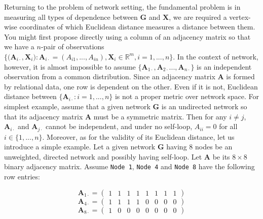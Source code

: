 \documentclass[12pt]{article}
\theoremstyle{definition}
\begin{document}
Returning to the problem of network setting, the fundamental problem is in measuring all types of dependence between $\boldsymbol{G}$ and $\boldsymbol{X}$, we are required a vertex-wise coordinates of which Euclidean distance measures a distance between them. You might first propose directly using a column of an adjacency matrix so that we have a $n$-pair of observations $\big\{ \big( \boldsymbol{A}_{i \cdot} , \boldsymbol{X}_{i} \big) : \boldsymbol{A}_{i \cdot} = (A_{i 1} , ... , A_{i n} ), \boldsymbol{X}_{i} \in \mathbb{R}^{m}, i=1,...,n  \big\}.$ In the context of network, however, it is almost impossible to assume $\{ \boldsymbol{A}_{1 \cdot}, \boldsymbol{A}_{2 \cdot} ... , \boldsymbol{A}_{n \cdot} \}$ is an independent observation from a common distribution. Since an adjacency matrix $\boldsymbol{A}$ is formed by relational data, one row is dependent on the other. Even if it is not, Euclidean distance between $\{ \boldsymbol{A}_{i \cdot} : i =1, ... , n \}$ is not a proper metric over network space. For simplest example, assume that a given network $\boldsymbol{G}$ is an undirected network so that its adjacency matrix $\boldsymbol{A}$ must be a symmetric matrix. Then for any $i \neq j$, $\boldsymbol{A}_{i \cdot}$ and $\boldsymbol{A}_{j \cdot}$ cannot be independent, and under no self-loop, $A_{ii} = 0$ for all $i \in \{1,...,n\}.$ Moreover, as for the validity of its Euclidean distance, let us introduce a simple example. Let a given network $\boldsymbol{G}$ having 8 nodes be an unweighted, directed network and possibly having self-loop. Let $\boldsymbol{A}$ be its $8 \times 8$ binary adjacency matrix. Assume \texttt{Node 1}, \texttt{Node 4} and \texttt{Node 8} have the following row entries:

\begin{equation}
\boldsymbol{A}_{1 \cdot} = \left( \begin{array}{rrrrrrrr} 1 & 1 & 1 & 1 & 1 & 1 & 1 & 1 \end{array} \right)
\end{equation}
\begin{equation}
\boldsymbol{A}_{4 \cdot} = \left( \begin{array}{rrrrrrrr} 1 & 1 & 1 & 1 & 0 & 0 & 0 & 0 \end{array} \right)
\end{equation}
\begin{equation}
\boldsymbol{A}_{8 \cdot} = \left( \begin{array}{rrrrrrrr} 1 & 0 & 0 & 0 & 0 & 0 & 0 & 0 \end{array} \right)
\end{equation}
\end{document}
